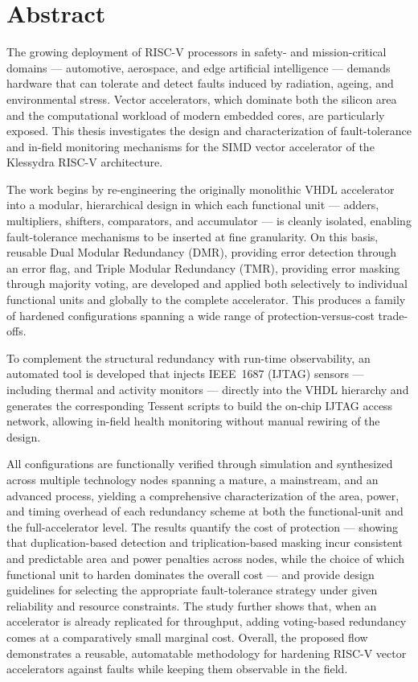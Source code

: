 \chapter*{Abstract}

The growing deployment of RISC-V processors in safety- and mission-critical
domains --- automotive, aerospace, and edge artificial intelligence --- demands
hardware that can tolerate and detect faults induced by radiation, ageing, and
environmental stress. Vector accelerators, which dominate both the silicon area
and the computational workload of modern embedded cores, are particularly
exposed. This thesis investigates the design and characterization of
fault-tolerance and in-field monitoring mechanisms for the SIMD vector
accelerator of the Klessydra RISC-V architecture.

The work begins by re-engineering the originally monolithic VHDL accelerator
into a modular, hierarchical design in which each functional unit --- adders,
multipliers, shifters, comparators, and accumulator --- is cleanly isolated,
enabling fault-tolerance mechanisms to be inserted at fine granularity. On this
basis, reusable Dual Modular Redundancy (DMR), providing error detection through
an error flag, and Triple Modular Redundancy (TMR), providing error masking
through majority voting, are developed and applied both selectively to
individual functional units and globally to the complete accelerator. This
produces a family of hardened configurations spanning a wide range of
protection-versus-cost trade-offs.

To complement the structural redundancy with run-time observability, an
automated tool is developed that injects IEEE~1687 (IJTAG) sensors --- including
thermal and activity monitors --- directly into the VHDL hierarchy and generates
the corresponding Tessent scripts to build the on-chip IJTAG access network,
allowing in-field health monitoring without manual rewiring of the design.

All configurations are functionally verified through simulation and synthesized
across multiple technology nodes spanning a mature, a mainstream, and an
advanced process, yielding a comprehensive characterization of the area, power,
and timing overhead of each redundancy scheme at both the functional-unit and
the full-accelerator level. The results quantify the cost of protection ---
showing that duplication-based detection and triplication-based masking incur
consistent and predictable area and power penalties across nodes, while the
choice of which functional unit to harden dominates the overall cost --- and
provide design guidelines for selecting the appropriate fault-tolerance strategy
under given reliability and resource constraints. The study further shows that,
when an accelerator is already replicated for throughput, adding voting-based
redundancy comes at a comparatively small marginal cost. Overall, the proposed
flow demonstrates a reusable, automatable methodology for hardening RISC-V vector
accelerators against faults while keeping them observable in the field.

